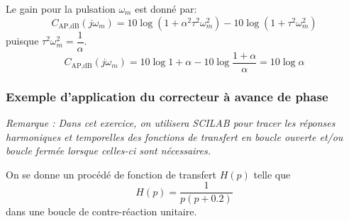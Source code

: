 Le gain pour la pulsation $\omega_m$ est donné par:
\[
    C_{\text{AP},\si{\dB}}(j\omega_m)=10\log{(1+\alpha^2\tau^2\omega_m^2)}-
                               10\log{(1+\tau^2\omega_m^2)}
\]
puisque $\tau^2\omega_m^2=\dfrac{1}{\alpha}$.
\[
    C_{\text{AP},\si{\dB}}(j\omega_m)=
    10\log{1+\alpha}-10\log{\dfrac{1+\alpha}{\alpha}}=10\log{\alpha}
\]
\subsubsection*{Exemple d'application du correcteur à avance de phase}
\emph{Remarque : Dans cet exercice, on utilisera SCILAB pour tracer les 
réponses harmoniques et temporelles des fonctions de transfert en 
boucle ouverte et/ou boucle fermée lorsque celles-ci sont nécessaires.}

On se donne un procédé de fonction de transfert $H(p)$ telle que
\[
    H(p)=\dfrac{1}{p(p+0.2)}
\]
dans une boucle de contre-réaction unitaire.

